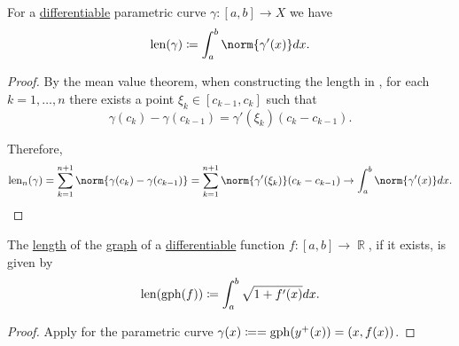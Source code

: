 \begin{proposition}\label{thm:length_of_smooth_curves}
  For a \hyperref[def:differentiability/frechet]{differentiable} parametric curve \( \gamma: [a, b] \to X \) we have
  \begin{equation*}
    \len(\gamma) \coloneqq \int_a^b \norm{\gamma'(x)} dx.
  \end{equation*}
\end{proposition}
\begin{proof}
  By the mean value theorem, when constructing the length in , for each \( k = 1, \ldots, n \) there exists a point \( \xi_k \in [c_{k-1}, c_k] \) such that
  \begin{equation*}
    \gamma(c_k) - \gamma(c_{k-1}) = \gamma'(\xi_k) (c_k - c_{k-1}).
  \end{equation*}

  Therefore,
  \begin{equation*}
    \len_n (\gamma)
    =
    \sum_{k=1}^{n+1} \norm{\gamma(c_k) - \gamma(c_{k-1})}
    =
    \sum_{k=1}^{n+1} \norm{\gamma'(\xi_k)} (c_k - c_{k-1})
    \to
    \int_a^b \norm{\gamma'(x)} dx.
  \end{equation*}
\end{proof}

\begin{corollary}\label{thm:length_of_function_graph}
  The \hyperref[def:parametric_curve_length]{length} of the \hyperref[def:multi_valued_function/graph]{graph} of a \hyperref[def:differentiability/frechet]{differentiable} function \( f: [a, b] \to \BbbR \), if it exists, is given by
  \begin{equation*}
    \operatorname{len}(\operatorname{gph}(f)) \coloneqq \int_a^b \sqrt{1 + f'(x)} dx.
  \end{equation*}
\end{corollary}
\begin{proof}
  Apply  for the parametric curve \( \gamma(x) \coloneqq = \operatorname{gph}(y^+(x)) = (x, f(x)) \).
\end{proof}
